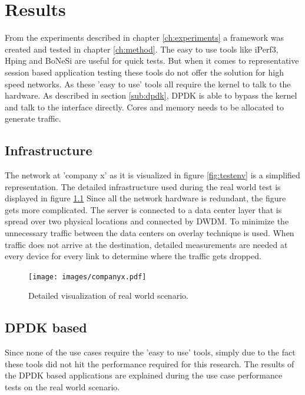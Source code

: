 \chapter{Results}\label{ch:results}

From the experiments described in chapter \ref{ch:experiments} a framework was created and tested in chapter \ref{ch:method}. 
The easy to use tools like iPerf3, Hping and BoNeSi are useful for quick tests. But when it comes to representative session based application testing these tools do not offer the solution for high speed networks. 
As these 'easy to use' tools all require the kernel to talk to the hardware. As described in section \ref{sub:dpdk}, DPDK is able to bypass the kernel and talk to the interface directly. Cores and memory needs to be allocated to generate traffic.  

\section{Infrastructure}
The network at 'company x' as it is visualized in figure \ref{fig:testenv} is a simplified representation.
The detailed infrastructure used during the real world test is displayed in figure \ref{fig:companyx} 
Since all the network hardware is redundant, the figure gets more complicated.
The server is connected to a data center layer that is spread over two physical locations and connected by DWDM.
To minimize the unnecessary traffic between the data centers on overlay technique is used.  
When traffic does not arrive at the destination, detailed measurements are needed at every device for every link to determine where the traffic gets dropped.  

\begin{figure}[] 
  \texttt{[image: images/companyx.pdf]}
  \caption{Detailed visualization of real world scenario.}
  \label{fig:companyx}
\end{figure}

\section{DPDK based}
Since none of the use cases require the 'easy to use' tools, simply due to the fact these tools did not hit the performance required for this research. 
The results of the DPDK based applications are explained during the use case performance tests on the real world scenario.
  
